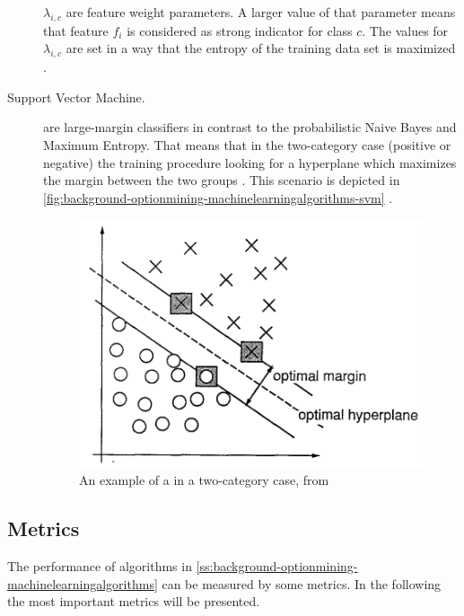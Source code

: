 \begin{description}
	$\lambda_{i,c}$ are feature weight parameters. A larger value of that parameter means that feature $f_i$ is considered as strong indicator for class $c$.
	The values for $\lambda_{i,c}$ are set in a way that the entropy of the training data set is maximized \citep{Pang2002}.
		
	\item[Support Vector Machine.]
	\svm{} are large-margin classifiers in contrast to the probabilistic Naive Bayes and Maximum Entropy.
	That means that in the two-category case (positive or negative) the training procedure looking for a hyperplane which maximizes the margin between the two groups \citep{Pang2002}.
	This scenario is depicted in \autoref{fig:background-optionmining-machinelearningalgorithms-svm} \citep[p. 275]{Cortes1995}.
		
	\begin{figure}[ht]
		\centering
		\includegraphics[width=.7\textwidth]{images/svm.png}
		\caption[An example of a \svm{} in a two-category case]{An example of a \svm{} in a two-category case, from \citep[p. 275]{Cortes1995}}
		\label{fig:background-optionmining-machinelearningalgorithms-svm}
	\end{figure}
	
\end{description}

\subsection{Metrics}
\label{ss:background-optionmining-metrics}

The performance of algorithms in \cref{ss:background-optionmining-machinelearningalgorithms} can be measured by some metrics.
In the following the most important metrics will be presented.

